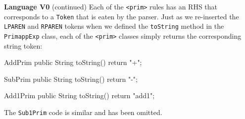 \begin{minipage}[t]{\sw}
\slidenumber
\LARGE
{\bf Language V0} (continued)\exx
Each of the \verb'<prim>' rules
has an RHS that corresponds to a \verb'Token'
that is eaten by the parser.
Just as we re-inserted the \verb'LPAREN' and \verb'RPAREN' tokens
when we defined the \verb'toString' method
in the \verb'PrimappExp' class,
each of the \verb'<prim>' classes simply returns
the corresponding string token:
{\large
\begin{qv}
AddPrim
    public String toString() {
        return "+";
    }

SubPrim
    public String toString() {
        return "-";
    }

Add1Prim
    public String toString() {
        return "add1";
    }
\end{qv}
}
The \verb'Sub1Prim' code is similar and has been omitted.
\end{minipage}
\clearpage
